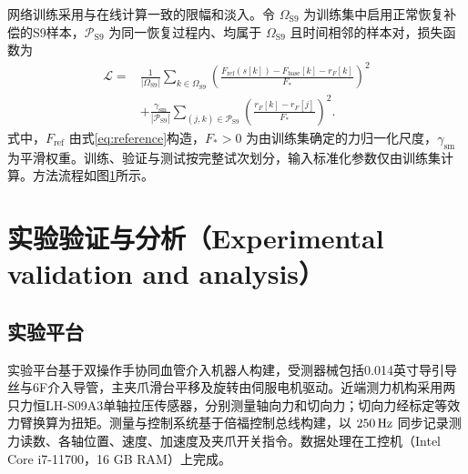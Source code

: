 \documentclass{JQRnew}
\providecommand{\RevisionColor}{\color{black}}
\newcommand{\revbegin}{\begingroup\RevisionColor}
\newcommand{\revend}{\par\endgroup}
\begin{document}
网络训练采用与在线计算一致的限幅和淡入。令 $\Omega_{\mathrm{S9}}$ 为训练集中启用正常恢复补偿的S9样本，$\mathcal P_{\mathrm{S9}}$ 为同一恢复过程内、均属于 $\Omega_{\mathrm{S9}}$ 且时间相邻的样本对，损失函数为
\begin{equation}
\label{eq:gru-loss}
\begin{aligned}
\mathcal L={}&\frac{1}{|\Omega_{\mathrm{S9}}|}\sum_{k\in\Omega_{\mathrm{S9}}}
\left(\frac{F_{\mathrm{ref}}(s[k])-F_{\mathrm{base}}[k]-r_F[k]}{F_*}\right)^2\\
&+\frac{\gamma_{\mathrm{sm}}}{|\mathcal P_{\mathrm{S9}}|}
\sum_{(j,k)\in\mathcal P_{\mathrm{S9}}}
\left(\frac{r_F[k]-r_F[j]}{F_*}\right)^2.
\end{aligned}
\end{equation}
式中，$F_{\mathrm{ref}}$ 由式\eqref{eq:reference}构造，$F_*>0$ 为由训练集确定的力归一化尺度，$\gamma_{\mathrm{sm}}$ 为平滑权重。训练、验证与测试按完整试次划分，输入标准化参数仅由训练集计算。方法流程如图\ref{fig4}所示。

\begin{figure}[H]
\centering
{}
\label{fig4}
\end{figure}

\section{实验验证与分析（Experimental validation and analysis）}

\subsection{实验平台}

\revbegin
实验平台基于双操作手协同血管介入机器人构建，受测器械包括0.014英寸导引导丝与6F介入导管，主夹爪滑台平移及旋转由伺服电机驱动。近端测力机构采用两只力恒LH-S09A3单轴拉压传感器，分别测量轴向力和切向力；切向力经标定等效力臂换算为扭矩。测量与控制系统基于倍福控制总线构建，以 $250\,{\rm Hz}$ 同步记录测力读数、各轴位置、速度、加速度及夹爪开关指令。数据处理在工控机（Intel Core i7-11700，16 GB RAM）上完成。
\revend
\end{document}
